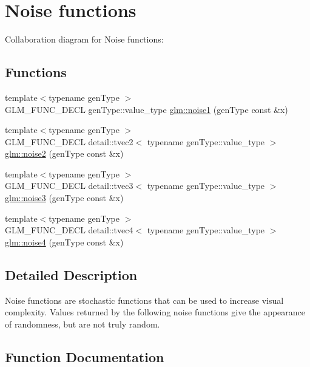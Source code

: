 \hypertarget{group__core__func__noise}{}\section{Noise functions}
\label{group__core__func__noise}
Collaboration diagram for Noise functions\+:
\subsection*{Functions}
\begin{DoxyCompactItemize}
\item 
{\footnotesize template$<$typename gen\+Type $>$ }\\G\+L\+M\+\_\+\+F\+U\+N\+C\+\_\+\+D\+E\+C\+L gen\+Type\+::value\+\_\+type \hyperlink{group__core__func__noise_gadcbf14e3390990f33fda02bb20836960}{glm\+::noise1} (gen\+Type const \&x)
\item 
{\footnotesize template$<$typename gen\+Type $>$ }\\G\+L\+M\+\_\+\+F\+U\+N\+C\+\_\+\+D\+E\+C\+L detail\+::tvec2$<$ typename gen\+Type\+::value\+\_\+type $>$ \hyperlink{group__core__func__noise_ga073d00b2005562407bb89075fd22e97c}{glm\+::noise2} (gen\+Type const \&x)
\item 
{\footnotesize template$<$typename gen\+Type $>$ }\\G\+L\+M\+\_\+\+F\+U\+N\+C\+\_\+\+D\+E\+C\+L detail\+::tvec3$<$ typename gen\+Type\+::value\+\_\+type $>$ \hyperlink{group__core__func__noise_ga47877815bf40d319a6dd7a4a4537e773}{glm\+::noise3} (gen\+Type const \&x)
\item 
{\footnotesize template$<$typename gen\+Type $>$ }\\G\+L\+M\+\_\+\+F\+U\+N\+C\+\_\+\+D\+E\+C\+L detail\+::tvec4$<$ typename gen\+Type\+::value\+\_\+type $>$ \hyperlink{group__core__func__noise_ga7b9b1094c67e4c8b7fd56bf9b0272072}{glm\+::noise4} (gen\+Type const \&x)
\end{DoxyCompactItemize}


\subsection{Detailed Description}
Noise functions are stochastic functions that can be used to increase visual complexity. Values returned by the following noise functions give the appearance of randomness, but are not truly random. 

\subsection{Function Documentation}
\hypertarget{group__core__func__noise_gadcbf14e3390990f33fda02bb20836960}{}
